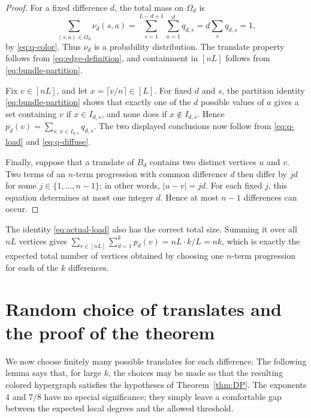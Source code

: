 \documentclass[twoside,12pt]{article}
\numberwithin{equation}{section}
\begin{document}
\begin{proof}
For a fixed difference $d$, the total mass on $\Omega_d$ is
\[
        \sum_{(s,a)\in\Omega_d}\nu_d(s,a)
        =\sum_{s=1}^{L-d+1}\sum_{a=1}^d q_{d,s}
        =d\sum_s q_{d,s}=1,
\]
by \eqref{eq:q-color}.  Thus $\nu_d$ is a probability distribution.  The
translate property follows from \eqref{eq:edge-definition}, and containment in
$[nL]$ follows from \eqref{eq:bundle-partition}.

Fix $v\in[nL]$, and let $x=\lceil v/n\rceil\in[L]$.  For fixed $d$ and $s$,
the partition identity \eqref{eq:bundle-partition} shows that exactly one of
the $d$ possible values of $a$ gives a set containing $v$ if $x\in I_{d,s}$,
and none does if $x\notin I_{d,s}$.  Hence $p_d(v)=\sum_{s:\,x\in I_{d,s}}q_{d,s}$.
The two displayed conclusions now follow from \eqref{eq:q-load} and
\eqref{eq:q-diffuse}.

Finally, suppose that a translate of $B_d$ contains two distinct vertices $u$
and $v$.  Two terms of an $n$-term progression with common difference $d$ then
differ by $jd$ for some $j\in\{1,\ldots,n-1\}$; in other words,
$|u-v|=jd$.  For each fixed $j$, this equation determines at most one integer
$d$.  Hence at most $n-1$ differences can occur.
\end{proof}

The identity \eqref{eq:actual-load} also has the correct total size.  Summing
it over all $nL$ vertices gives
$\sum_{v\in[nL]}\sum_{d=1}^k p_d(v)=nL\cdot k/L=nk$, which is exactly the
expected total number of vertices obtained by choosing one $n$-term progression
for each of the $k$ differences.

\section{Random choice of translates and the proof of the theorem}

We now choose finitely many possible translates for each difference.  The
following lemma says that, for large $k$, the choices may be made so that the
resulting colored hypergraph satisfies the hypotheses of Theorem~\ref{thm:DP}.
The exponents $4$ and $7/8$ have no special significance; they simply leave a
comfortable gap between the expected local degrees and the allowed threshold.
\end{document}
